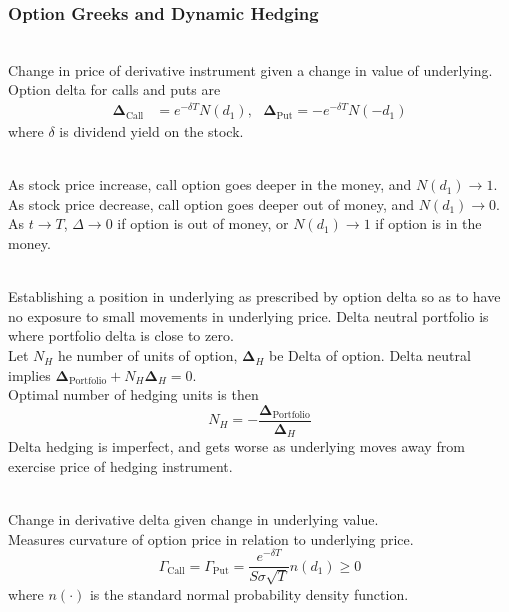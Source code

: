 \subsubsection{Option Greeks and Dynamic Hedging}

\begin{definition} \\
Change in price of derivative instrument given a change in value of underlying.\\
Option delta for calls and puts are
\begin{align}
\bm{\Delta}_{\text{Call}} &= e^{-\delta T}N(d_1), \ \ \ \bm{\Delta}_{\text{Put}} = - e^{-\delta T}N(-d_1) \nonumber
\end{align}
where $\delta$ is dividend yield on the stock.
\end{definition}

\begin{remark} \\
As stock price increase, call option goes deeper in the money, and $N(d_1) \rightarrow 1$.\\
As stock price decrease, call option goes deeper out of money, and $N(d_1) \rightarrow 0$.\\
As $t \rightarrow T$, $\Delta \rightarrow 0$ if option is out of money, or $N(d_1) \rightarrow 1$ if option is in the money.
\end{remark}

\begin{definition}  \\
Establishing a position in underlying as prescribed by option delta so as to have no exposure to small movements in underlying price. Delta neutral portfolio is where portfolio delta is close to zero.\\
Let $N_H$ he number of units of option, $\bm{\Delta}_H$ be Delta of option. Delta neutral implies $\bm{\Delta}_{\text{Portfolio}} + N_H \bm{\Delta}_H = 0$.\\
Optimal number of hedging units is then
\begin{equation}
N_H = - \frac{\bm{\Delta}_{\text{Portfolio}}}{\bm{\Delta}_H} \nonumber
\end{equation}
Delta hedging is imperfect, and gets worse as underlying moves away from exercise price of hedging instrument.
\end{definition}

\begin{definition} \\
Change in derivative delta given change in underlying value.\\
Measures curvature of option price in relation to underlying price.
\begin{equation}
\Gamma_{\text{Call}} = \Gamma_{\text{Put}} = \frac{e^{-\delta T}}{S \sigma \sqrt{T}} n(d_1) \geq 0 \nonumber
\end{equation}
where $n(\cdot)$ is the standard normal probability density function.
\end{definition}

